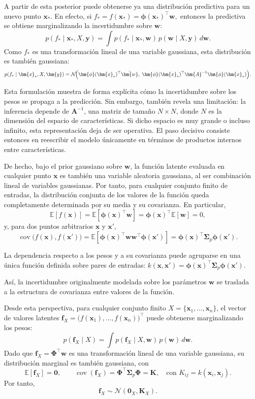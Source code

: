 A partir de esta posterior puede obtenerse ya una distribución predictiva para un nuevo
punto \(\bm{x}_*\). En efecto, si
$
f_* = f(\bm{x}_*)=\bm{\phi}(\bm{x}_*)^\top \bm{w},
$
entonces la predictiva se obtiene marginalizando la incertidumbre sobre \(\bm{w}\):
\[
p(f_*\mid \bm{x}_*,X,\bm{y})
=
\int p(f_*\mid \bm{x}_*,\bm{w})\,p(\bm{w}\mid X,\bm{y})\,d\bm{w}.
\]
Como \(f_*\) es una transformación lineal de una variable gaussiana, esta distribución es
también gaussiana:
\[
p(f_*\mid \bm{x}_*,X,\bm{y})
=
\mathcal{N}\!\Bigl(
\bm{\phi}(\bm{x}_*)^\top \bar{\bm{w}},
\;
\bm{\phi}(\bm{x}_*)^\top \bm{A}^{-1}\bm{\phi}(\bm{x}_*)
\Bigr).
\]

Esta formulación muestra de forma explícita cómo la incertidumbre sobre los pesos se
propaga a la predicción. Sin embargo, también revela una limitación: la
inferencia depende de \(\bm{A}^{-1}\), una matriz de tamaño \(N\times N\), donde \(N\) es la
dimensión del espacio de características. Si dicho espacio es muy grande o incluso infinito,
esta representación deja de ser operativa. El paso decisivo consiste entonces en reescribir el
modelo únicamente en términos de productos internos entre características.

De hecho, bajo el prior gaussiano sobre \(\bm{w}\), la función latente evaluada en cualquier
punto \(\bm{x}\) es también una variable aleatoria gaussiana, al ser combinación lineal de
variables gaussianas. Por tanto, para cualquier conjunto finito de entradas, la distribución
conjunta de los valores de la función queda completamente determinada por su media y su
covarianza. En particular,
\[
\mathbb{E}[f(\bm{x})]
=
\mathbb{E}[\bm{\phi}(\bm{x})^\top\bm{w}]
=
\bm{\phi}(\bm{x})^\top\mathbb{E}[\bm{w}]
=
0,
\]
y, para dos puntos arbitrarios \(\bm{x}\) y \(\bm{x}'\),
\[
\operatorname{cov}\bigl(f(\bm{x}),f(\bm{x}')\bigr)
=
\mathbb{E}\!\left[
\bm{\phi}(\bm{x})^\top \bm{w}\bm{w}^\top \bm{\phi}(\bm{x}')
\right]
=
\bm{\phi}(\bm{x})^\top \bm{\Sigma}_p \bm{\phi}(\bm{x}').
\]

La dependencia respecto a los pesos y a su covarianza puede agruparse en una única función definida sobre pares de
entradas:
$
k(\bm{x},\bm{x}')
=
\bm{\phi}(\bm{x})^\top \bm{\Sigma}_p \bm{\phi}(\bm{x}').
$

Así, la incertidumbre originalmente modelada sobre los parámetros \(\bm{w}\) se traslada a la
estructura de covarianza entre valores de la función.

Desde esta perspectiva, para cualquier conjunto finito
\(X=\{\bm{x}_1,\dots,\bm{x}_n\}\), el vector de valores latentes
$
\bm{f}_X =
\bigl(f(\bm{x}_1),\dots,f(\bm{x}_n)\bigr)^\top
$
puede obtenerse marginalizando los pesos:
\[
p(\bm{f}_X\mid X)
=
\int p(\bm{f}_X\mid X,\bm{w})\,p(\bm{w})\,d\bm{w}.
\]
Dado que \(\bm{f}_X=\bm{\Phi}^\top \bm{w}\) es una transformación lineal de una variable
gaussiana, su distribución marginal es también gaussiana, con
\[
\mathbb{E}[\bm{f}_X]=\bm{0},
\qquad
\operatorname{cov}(\bm{f}_X)=\bm{\Phi}^\top \bm{\Sigma}_p \bm{\Phi}=\bm{K},
\quad \text{con } K_{ij}=k(\bm{x}_i,\bm{x}_j).
\]
Por tanto,
\[
\bm{f}_X \sim \mathcal{N}(\bm{0}_X,\bm{K}_X).
\]

